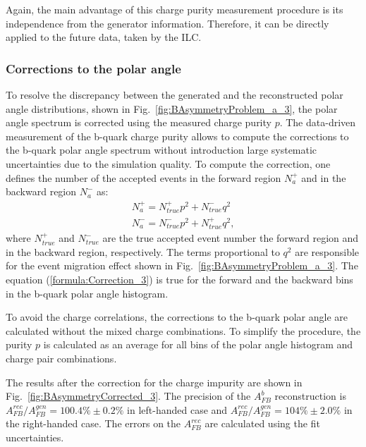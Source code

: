 Again, the main advantage of this charge purity measurement procedure is its independence from the generator information. 
Therefore, it can be directly applied to the future data, taken by the ILC.


\subsubsection{Corrections to the polar angle}
To resolve the discrepancy between the generated and the reconstructed polar angle distributions, shown in Fig.~\ref{fig:BAsymmetryProblem_a_3}, the polar angle spectrum is corrected using the measured charge purity $p$.
The data-driven measurement of the b-quark charge purity allows to compute the corrections to the b-quark polar angle spectrum without introduction large systematic uncertainties due to the simulation quality. 
To compute the correction, one defines the number of the accepted events in the forward region $N_a^+$ and in the backward region $N_a^-$ as:
\begin{equation}
\begin{array}{l}
N_a^+ =  N^+_{true}p^2 + N^-_{true}q^2\\
N_a^- =  N^-_{true}p^2 + N^+_{true}q^2,
\end{array}
\label{formula:Correction_3}
\end{equation}
where $N_{true}^+$ and  $N_{true}^-$ are the true accepted event number the forward region and in the backward region, respectively.
The terms proportional to $q^2$ are responsible for the event migration effect shown in Fig.~\ref{fig:BAsymmetryProblem_a_3}.
The equation (\ref{formula:Correction_3}) is true for the forward and the backward bins in the b-quark polar angle histogram.

To avoid the charge correlations, the  corrections to the b-quark polar angle are calculated without the mixed charge combinations.
To simplify the procedure, the purity $p$ is calculated as an average for all bins of the polar angle histogram and charge pair combinations. 


The results after the correction for the charge impurity are shown in Fig.~\ref{fig:BAsymmetryCorrected_3}. 
The precision of the $A_{FB}^b$ reconstruction is $A_{FB}^{rec}/A^{gen}_{FB} = 100.4\%\pm 0.2\%$ in left-handed case and  $A_{FB}^{rec}/A^{gen}_{FB} = 104\%\pm2.0\%$ in the right-handed case. 
The errors on the $A_{FB}^{rec}$ are calculated using the fit uncertainties. 

